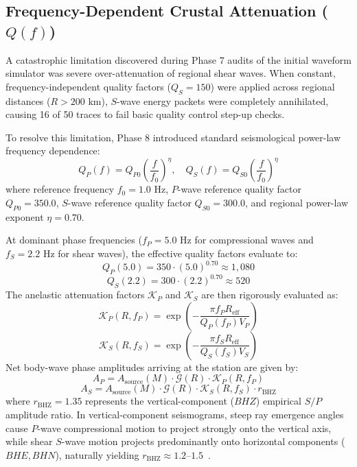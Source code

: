 \documentclass[journal]{IEEEtran}
\begin{document}
\subsection{Frequency-Dependent Crustal Attenuation ($Q(f)$)}
A catastrophic limitation discovered during Phase 7 audits of the initial waveform simulator was severe over-attenuation of regional shear waves. When constant, frequency-independent quality factors ($Q_S = 150$) were applied across regional distances ($R > 200\text{ km}$), $S$-wave energy packets were completely annihilated, causing 16 of 50 traces to fail basic quality control step-up checks.

To resolve this limitation, Phase 8 introduced standard seismological power-law frequency dependence:
\begin{equation}
Q_P(f) = Q_{P0} \left( \frac{f}{f_0} \right)^\eta, \quad Q_S(f) = Q_{S0} \left( \frac{f}{f_0} \right)^\eta
\label{eq:crustal_q}
\end{equation}
where reference frequency $f_0 = 1.0\text{ Hz}$, $P$-wave reference quality factor $Q_{P0} = 350.0$, $S$-wave reference quality factor $Q_{S0} = 300.0$, and regional power-law exponent $\eta = 0.70$.

At dominant phase frequencies ($f_P = 5.0\text{ Hz}$ for compressional waves and $f_S = 2.2\text{ Hz}$ for shear waves), the effective quality factors evaluate to:
\begin{equation}
Q_P(5.0) = 350 \cdot (5.0)^{0.70} \approx 1,080
\end{equation}
\begin{equation}
Q_S(2.2) = 300 \cdot (2.2)^{0.70} \approx 520
\end{equation}
The anelastic attenuation factors $\mathcal{K}_P$ and $\mathcal{K}_S$ are then rigorously evaluated as:
\begin{equation}
\mathcal{K}_P(R, f_P) = \exp\left( - \frac{\pi f_P R_{\text{eff}}}{Q_P(f_P) V_P} \right)
\label{eq:kappa_p}
\end{equation}
\begin{equation}
\mathcal{K}_S(R, f_S) = \exp\left( - \frac{\pi f_S R_{\text{eff}}}{Q_S(f_S) V_S} \right)
\label{eq:kappa_s}
\end{equation}
Net body-wave phase amplitudes arriving at the station are given by:
\begin{equation}
A_P = A_{\text{source}}(M) \cdot \mathcal{G}(R) \cdot \mathcal{K}_P(R, f_P)
\label{eq:a_p}
\end{equation}
\begin{equation}
A_S = A_{\text{source}}(M) \cdot \mathcal{G}(R) \cdot \mathcal{K}_S(R, f_S) \cdot r_{\text{BHZ}}
\label{eq:a_s}
\end{equation}
where $r_{\text{BHZ}} = 1.35$ represents the vertical-component ($BHZ$) empirical $S/P$ amplitude ratio. In vertical-component seismograms, steep ray emergence angles cause $P$-wave compressional motion to project strongly onto the vertical axis, while shear $S$-wave motion projects predominantly onto horizontal components ($BHE, BHN$), naturally yielding $r_{\text{BHZ}} \approx 1.2$--$1.5$~\cite{brune1970tectonic}.
\end{document}
